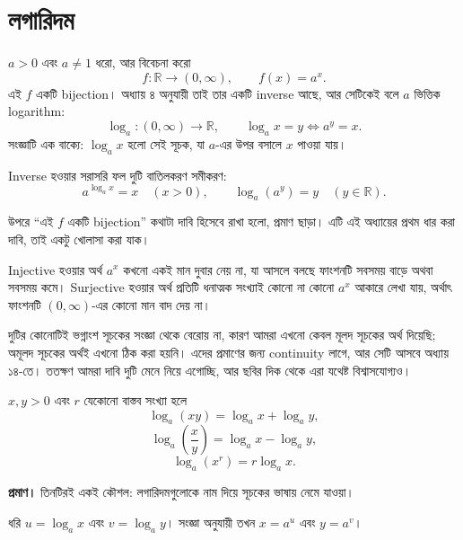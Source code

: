 \documentclass[11pt]{article}
\begin{document}
\section{লগারিদম}

\begin{idea}[লগারিদম মানে সূচকের বিপরীত]
$a > 0$ এবং $a \neq 1$ ধরো, আর বিবেচনা করো
\[
  f \colon \mathbb{R} \to (0, \infty), \qquad f(x) = a^{x} .
\]
এই $f$ একটি bijection। অধ্যায় ৪ অনুযায়ী তাই তার একটি inverse আছে, আর
সেটিকেই বলে $a$ ভিত্তিক logarithm:
\[
  \log_a \colon (0, \infty) \to \mathbb{R} ,
  \qquad
  \log_a x = y \iff a^{y} = x .
\]
সংজ্ঞাটি এক বাক্যে: $\log_a x$ হলো সেই সূচক, যা $a$-এর উপর বসালে $x$ পাওয়া যায়।

Inverse হওয়ার সরাসরি ফল দুটি বাতিলকরণ সমীকরণ:
\[
  a^{\log_a x} = x \quad (x > 0), \qquad \log_a (a^{y}) = y \quad (y \in \mathbb{R}) .
\]
\end{idea}

\begin{remark}
উপরে ``এই $f$ একটি bijection'' কথাটা দাবি হিসেবে রাখা হলো, প্রমাণ ছাড়া। এটি
এই অধ্যায়ের প্রথম ধার করা দাবি, তাই একটু খোলাসা করা যাক।

Injective হওয়ার অর্থ $a^{x}$ কখনো একই মান দুবার নেয় না, যা আসলে বলছে ফাংশনটি
সবসময় বাড়ে অথবা সবসময় কমে। Surjective হওয়ার অর্থ প্রতিটি ধনাত্মক সংখ্যাই
কোনো না কোনো $a^{x}$ আকারে লেখা যায়, অর্থাৎ ফাংশনটি $(0,\infty)$-এর কোনো মান
বাদ দেয় না।

দুটির কোনোটিই ভগ্নাংশ সূচকের সংজ্ঞা থেকে বেরোয় না, কারণ আমরা এখনো কেবল মূলদ
সূচকের অর্থ দিয়েছি; অমূলদ সূচকের অর্থই এখনো ঠিক করা হয়নি। এদের প্রমাণের জন্য
continuity লাগে, আর সেটি আসবে অধ্যায় ১৪-তে। ততক্ষণ আমরা দাবি দুটি মেনে
নিয়ে এগোচ্ছি, আর ছবির দিক থেকে এরা যথেষ্ট বিশ্বাসযোগ্যও।
\end{remark}

\begin{idea}[লগারিদমের নিয়ম]
$x, y > 0$ এবং $r$ যেকোনো বাস্তব সংখ্যা হলে
\[
  \log_a(xy) = \log_a x + \log_a y ,
\]
\[
  \log_a\!\left( \frac{x}{y} \right) = \log_a x - \log_a y ,
\]
\[
  \log_a (x^{r}) = r \log_a x .
\]
\end{idea}

\noindent
\textbf{প্রমাণ।} তিনটিরই একই কৌশল: লগারিদমগুলোকে নাম দিয়ে সূচকের ভাষায় নেমে
যাওয়া।

ধরি $u = \log_a x$ এবং $v = \log_a y$। সংজ্ঞা অনুযায়ী তখন $x = a^{u}$ এবং
$y = a^{v}$।
\end{document}
